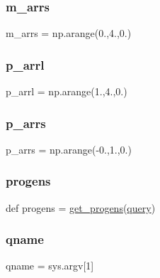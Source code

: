 \mbox{\label{namespacequery_ac323a9cbb94178daa2549f554bd92baa}} 
\subsubsection{\texorpdfstring{m\+\_\+arrs}{m\_arrs}}
{\footnotesize\ttfamily m\+\_\+arrs = np.\+arange(0.,4.,0.)}

\mbox{\label{namespacequery_aa2c4078b994af1c9ad5f0821590d0eea}} 
\subsubsection{\texorpdfstring{p\+\_\+arrl}{p\_arrl}}
{\footnotesize\ttfamily p\+\_\+arrl = np.\+arange(1.,4.,0.)}

\mbox{\label{namespacequery_acb09178e64b20ef1abc8365eba1ca4fc}} 
\subsubsection{\texorpdfstring{p\+\_\+arrs}{p\_arrs}}
{\footnotesize\ttfamily p\+\_\+arrs = np.\+arange(-\/0.,1.,0.)}

\mbox{\label{namespacequery_aadb205048dceb51ed98dc76b0cbc9d00}} 
\subsubsection{\texorpdfstring{progens}{progens}}
{\footnotesize\ttfamily def progens = \hyperlink{namespacequery_aa6657f1df72e61cb1a20d05df95d7dec}{get\+\_\+progens}(\hyperlink{namespacequery_a7077167865224233566753fc78aadb36}{query})}

\mbox{\label{namespacequery_ad85ee362e4d3c01fe2dfe01e693174c5}} 
\subsubsection{\texorpdfstring{qname}{qname}}
{\footnotesize\ttfamily qname = sys.\+argv\mbox{[}1\mbox{]}}

